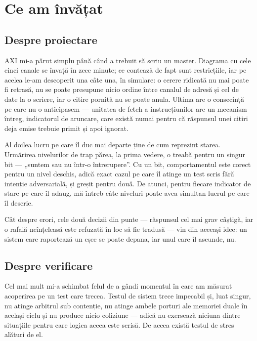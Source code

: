 \documentclass[11pt,openany]{report}
\begin{document}
\section{Ce am învățat}

\subsection{Despre proiectare}

AXI mi-a părut simplu până când a trebuit să scriu un master. Diagrama cu cele
cinci canale se învață în zece minute; ce contează de fapt sunt restricțiile, iar
pe acelea le-am descoperit una câte una, în simulare: o cerere ridicată nu mai
poate fi retrasă, nu se poate presupune nicio ordine între canalul de adresă și
cel de date la o scriere, iar o citire pornită nu se poate anula. Ultima are o
consecință pe care nu o anticipasem --- unitatea de fetch a instrucțiunilor are
un mecanism întreg, indicatorul de aruncare, care există numai pentru că
răspunsul unei citiri deja emise trebuie primit și apoi ignorat.

Al doilea lucru pe care îl duc mai departe ține de cum reprezint starea.
Urmărirea nivelurilor de trap părea, la prima vedere, o treabă pentru un singur
bit --- „suntem sau nu într-o întrerupere”. Cu un bit, comportamentul este corect
pentru un nivel deschis, adică exact cazul pe care îl atinge un test scris fără
intenție adversarială, și greșit pentru două. De atunci, pentru fiecare indicator
de stare pe care îl adaug, mă întreb câte niveluri poate avea simultan lucrul pe
care îl descrie.

Cât despre erori, cele două decizii din punte --- răspunsul cel mai grav câștigă,
iar o rafală neînțeleasă este refuzată în loc să fie tradusă --- vin din aceeași
idee: un sistem care raportează un eșec se poate depana, iar unul care îl ascunde,
nu.

\subsection{Despre verificare}

Cel mai mult mi-a schimbat felul de a gândi momentul în care am măsurat acoperirea
pe un test care trecea. Testul de sistem trece impecabil și, luat singur, nu
atinge arbitrul sub contenție, nu atinge ambele porturi ale memoriei duale în
același ciclu și nu produce nicio coliziune --- adică nu exersează niciuna dintre
situațiile pentru care logica aceea este scrisă. De aceea există testul de stres
alături de el.
\end{document}

